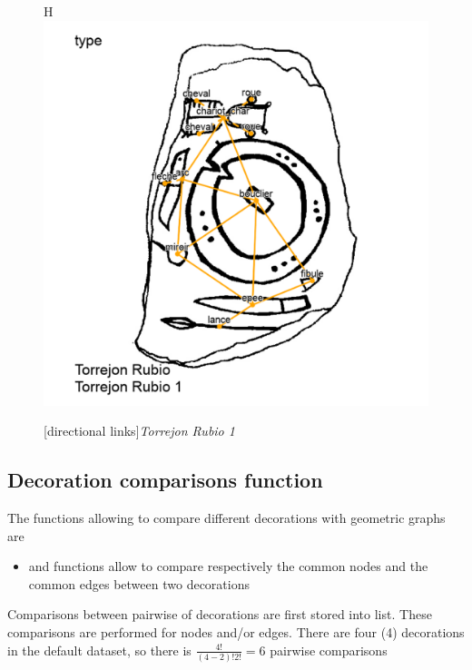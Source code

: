 \documentclass[article]{jss}\usepackage[]{graphicx}\usepackage[]{color}
\makeatletter
\def\maxwidth{ %
  \ifdim\Gin@nat@width>\linewidth
    \linewidth
  \else
    \Gin@nat@width
  \fi
}
\newenvironment{knitrout}{}{} %
\makeatother
\begin{document}
\begin{figure}{H}
\begin{knitrout}
\includegraphics[width=\maxwidth]{figure/plotcm-1} 

\end{knitrout}
[directional links]{\emph{Torrejon Rubio 1}}
\end{figure}

\subsection{Decoration comparisons function} \label{sec:functions_one}

The functions allowing to compare different decorations with geometric graphs are

\begin{itemize}
  \item {} and  functions allow to compare respectively the common nodes and the common edges between two decorations
\end{itemize}

Comparisons between pairwise of decorations are first stored into list. These comparisons are performed for nodes and/or edges. There are four (4) decorations in the default dataset, so there is $\frac{4!}{(4-2)!2!}={6}$ pairwise comparisons
\end{document}

